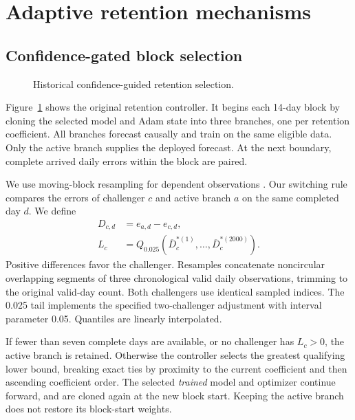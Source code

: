\section{Adaptive retention mechanisms}\label{sec:retention}
\subsection{Confidence-gated block selection}
\begin{figure}[htbp]
\centering\resizebox{.96\linewidth}{!}{}
\caption{Historical confidence-guided retention selection.}\label{fig:retention}
\end{figure}
Figure~\ref{fig:retention} shows the original retention controller. It begins each 14-day block by cloning the selected model and Adam state into three branches, one per retention coefficient. All branches forecast causally and train on the same eligible data. Only the active branch supplies the deployed forecast. At the next boundary, complete arrived daily errors within the block are paired.

We use moving-block resampling for dependent observations \cite{kunsch1989}. Our switching rule compares the errors of challenger $c$ and active branch $a$ on the same completed day $d$. We define
\begin{equation}\begin{aligned}
D_{c,d}&=e_{a,d}-e_{c,d},\\
L_c&=Q_{0.025}\!\left(\overline{D}_{c}^{*(1)},\ldots,
\overline{D}_{c}^{*(2000)}\right).
\end{aligned}\label{eq:lcb}\end{equation}
Positive differences favor the challenger. Resamples concatenate noncircular overlapping segments of three chronological valid daily observations, trimming to the original valid-day count. Both challengers use identical sampled indices. The 0.025 tail implements the specified two-challenger adjustment with interval parameter 0.05. Quantiles are linearly interpolated.

If fewer than seven complete days are available, or no challenger has $L_c>0$, the active branch is retained. Otherwise the controller selects the greatest qualifying lower bound, breaking exact ties by proximity to the current coefficient and then ascending coefficient order. The selected \emph{trained} model and optimizer continue forward, and are cloned again at the new block start. Keeping the active branch does not restore its block-start weights.

